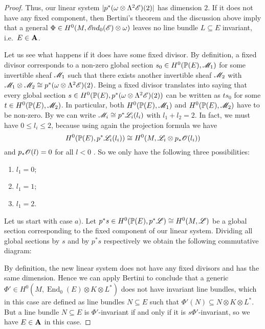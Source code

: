 \documentclass[A4paper, 12pt, british, reqno]{amsart}
\DeclareMathOperator{\End}{End}
\newcommand{\ot}{\otimes}
\newcommand{\dual}{^{*}}
\begin{document}
\begin{prop}
\begin{proof}
	Thus, our linear system $|p^{*}(\w\ot \Lambda^{2}\E)(2)|$ has dimension $2$.
	If it does not have any fixed component, then Bertini's theorem \cite[Theorem 7.19]{iit82} and the discussion above imply that a general $\Phi\in H^{0}(M,\sEnd_{0}(\E)\ot \w)$ leaves no line bundle $L\subseteq E$ invariant, i.e.~$E\in \mathbf{A}$.

	Let us see what happens if it does have some fixed divisor.
	By definition, a fixed divisor corresponds to a non-zero global section $s_{0}\in H^{0}(\mathbb{P}(E),\mathscr{M}_{1})$ for some invertible sheaf $\mathscr{M}_{1}$ such that there exists another invertible sheaf $\mathscr{M}_{2}$ with $\M_{1}\ot \M_{2}\cong p^{*}(\w\ot\Lambda^{2}\E)(2)$.
	Being a fixed divisor translates into saying that every global section $s\in H^{0}(\P(E),p^{*}(\w\ot \Lambda^{2}\E)(2))$ can be written as $ts_{0}$ for some $t\in H^{0}(\mathbb{P}(E),\mathscr{M}_{2})$.
	In particular, both $H^{0}(\mathbb{P}(E),\mathscr{M}_{1})$ and $H^{0}(\mathbb{P}(E),\mathscr{M}_{2})$ have to be non-zero.
	By \cite[Exercise II.7.4]{har77} we can write $\mathscr{M}_{i}\cong p^{*}\mathscr{L}_{i}(l_{i})$ with $l_{1}+l_{2}=2$.
	In fact, we must have $0\leqslant l_{i}\leqslant 2$, because using again the projection formula we have
	\[ H^{0}(\P(E),p^{*}\L_{i}(l_{i}))\cong H^{0}(M,\L_{i}\ot p_{*}\O(l_{i})) \]
	and $p_{*}\mathscr{O}(l)=0$ for all $l<0$ \cite[Exercise III.8.4]{har77}.
	So we only have the following three possibilities:
	\begin{enumerate}[label=\alph*)]
	    \item $l_{1}=0$;
	    \item $l_{1}=1$;
	    \item $l_{1}=2$.
	\end{enumerate}
	Let us start with case $a)$.
	Let $p^{*}s\in H^{0}(\mathbb{P}(E),p^{*}\mathscr{L})\cong H^{0}(M,\mathscr{L})$ be a global section corresponding to the fixed component of our linear system.
	Dividing all global sections by $s$ and by $p^{*}s$ respectively we obtain the following commutative diagram:
	\begin{center}
	\end{center}
	By definition, the new linear system does not have any fixed divisors and has the same dimension.
	Hence we can apply Bertini to conclude that a generic $\Phi'\in H^{0}(M,\End_{0}(E)\ot K\ot L\dual)$ does not have invariant line bundles, which in this case are defined as line bundles $N\subseteq E$ such that $\Phi'(N)\subseteq N\ot K\ot L\dual$.
	But a line bundle $N\subseteq E$ is $\Phi'$-invariant if and only if it is $s\Phi'$-invariant, so we have $E\in \mathbf{A}$ in this case.


\end{proof}
\end{prop}
\end{document}
